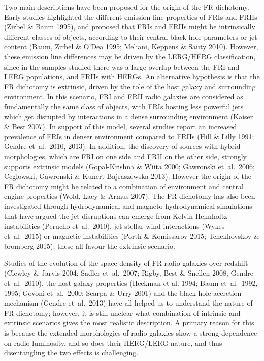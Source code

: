 \documentclass[usenatbib]{mn2e}
\begin{document}
Two main descriptions have been proposed for the origin of the FR
dichotomy. Early studies highlighted the different emission line
properties of FRIs and FRIIs (Zirbel \& Baum 1995), and proposed that FRIs
and FRIIs might be intrinsically different classes of objects, according
to their central black hole parameters or jet content (Baum, Zirbel \&
O'Dea 1995; Meliani, Keppens \& Sauty 2010). However, these emission line
differences may be driven by the LERG/HERG classification, since in the
samples studied there was a large overlap between the FRI and LERG
populations, and FRIIs with HERGs. An alternative hypothesis is that the
FR dichotomy is extrinsic, driven by the role of the host galaxy and
surrounding environment. In this scenario, FRI and FRII radio galaxies are
considered as fundamentally the same class of objects, with FRIs hosting
less powerful jets which get disrupted by interactions in a dense
surrounding environment (Kaiser \& Best 2007). In support of this model,
several studies report an increased prevalence of FRIs in denser
environment compared to FRIIs (Hill \& Lilly 1991; Gendre et~al.\ 2010, 2013).
 In addition, the discovery of sources with hybrid morphologies,
which are FRI on one side and FRII on the other side, strongly supports
extrinsic models (Gopal-Krishna \& Wiita 2000; Gawronski et~al.\ 2006;
Ceglowski, Gawronski \& Kunert-Bajraszewska 2013). However the origin of
the FR dichotomy might be related to a combination of environment and
central engine properties (Wold, Lacy \& Armus 2007). The FR dichotomy has
also been investigated through hydrodynamical and magneto-hydrodynamical
simulations that have argued the jet disruptions can emerge from
Kelvin-Helmholtz instabilities (Perucho et~al.\ 2010), jet-stellar wind
interactions (Wykes et~al.\ 2015) or magnetic instabilities (Porth \&
Komissarov 2015; Tchekhovskoy \& bromberg 2015); these all favour the
extrinsic scenario.
 
Studies of the evolution of the space density of FR radio galaxies over
redshift (Clewley \& Jarvis 2004; Sadler et~al.\ 2007; Rigby, Best \&
Snellen 2008; Gendre et~al.\ 2010), the host galaxy properties (Heckman et
al. 1994; Baum et~al.\ 1992, 1995; Govoni et~al.\ 2000; Scarpa \& Urry 2001)
and the black hole accretion mechanism (Gendre et~al.\ 2013) have all
helped us to understand the nature of FR dichotomy; however, it is still
unclear what combination of intrinsic and extrinsic scenarios gives the
most realistic description. A primary reason for this is because the
extended morphologies of radio galaxies show a strong dependence on radio
luminosity, and so does their HERG/LERG nature, and thus disentangling the
two effects is challenging.
\end{document}
